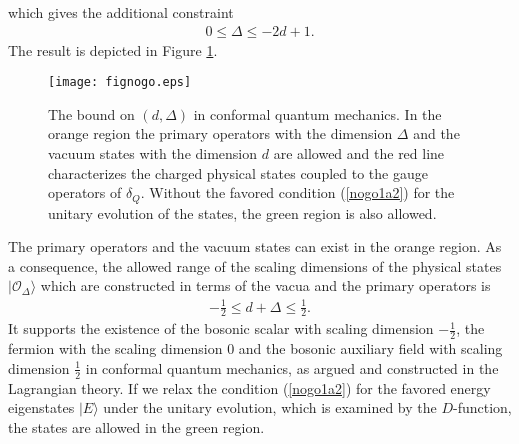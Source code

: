 \documentclass[12pt]{article}
\numberwithin{equation}{section}
\begin{document}
which gives the additional constraint
\begin{align}
\label{nogo1a1a}
0\le \Delta \le -2d+1. 
\end{align}
The result is depicted in Figure \ref{fignogo}. 
%
%
%
%
\begin{figure}
\begin{center}
\texttt{[image: fignogo.eps]}
\vspace*{1.5cm}
\caption{The bound on $(d,\Delta)$ in conformal quantum mechanics. 
In the orange region the primary operators with the dimension $\Delta$ 
and the vacuum states with the dimension $d$ are allowed 
and the red line characterizes the charged physical states coupled to the gauge operators of $\delta_{Q}$. 
Without the favored condition (\ref{nogo1a2}) for the unitary evolution of the states, 
the green region is also allowed. }
\label{fignogo}
\end{center}
\end{figure}
%
%
%
The primary operators and the vacuum states can exist 
in the orange region. 
As a consequence, the allowed range of the scaling dimensions of the 
physical states $|\mathcal{O}_{\Delta} \rangle$ which are constructed in terms of 
the vacua and the primary operators is
\begin{align}
\label{nogo1a1}
-\frac12\le d+\Delta\le \frac12. 
\end{align}
It supports the existence of the bosonic scalar with scaling dimension $-\frac12$, 
the fermion with the scaling dimension $0$ and the bosonic auxiliary field with scaling dimension $\frac12$ 
in conformal quantum mechanics, 
as argued and constructed in the Lagrangian theory. 
If we relax the condition (\ref{nogo1a2}) for the favored energy eigenstates $|E\rangle$ under the unitary evolution, 
which is examined by the $D$-function, the states are allowed in the green region. 
\end{document}
